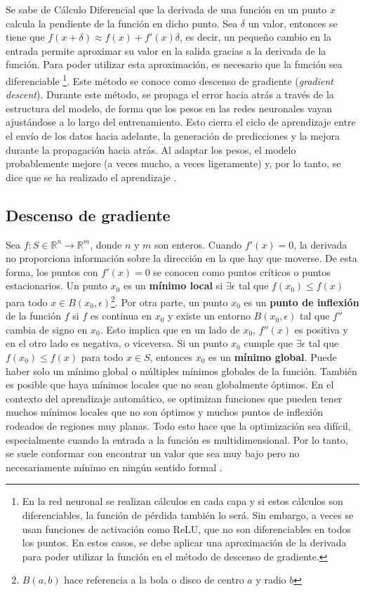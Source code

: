 Se sabe de Cálculo Diferencial que la derivada de una función en un punto $x$ calcula la pendiente de la función en dicho punto. Sea $\delta$ un valor, entonces se tiene que $f(x + \delta) \approx f(x) + f'(x)\delta$, es decir, un pequeño cambio en la entrada permite aproximar su valor en la salida gracias a la derivada de la función. Para poder utilizar esta aproximación, es necesario que la función sea diferenciable \footnote{En la red neuronal se realizan cálculos en cada capa y si estos cálculos son diferenciables, la función de pérdida también lo será. Sin embargo, a veces se usan funciones de activación como ReLU, que no son diferenciables en todos los puntos. En estos casos, se debe aplicar una aproximación de la derivada para poder utilizar la función en el método de descenso de gradiente.}. Este método se conoce como descenso de gradiente (\textit{gradient descent}). Durante este método, se propaga el error hacia atrás a través de la estructura del modelo, de forma que los pesos en las redes neuronales vayan ajustándose a lo largo del entrenamiento. Esto cierra el ciclo de aprendizaje entre el envío de los datos hacia adelante, la generación de predicciones y la mejora durante la propagación hacia atrás. Al adaptar los pesos, el modelo probablemente mejore (a veces mucho, a veces ligeramente) y, por lo tanto, se dice que se ha realizado el aprendizaje \citep{pajares2021aprendizaje}. 

\subsection{Descenso de gradiente}


Sea $f: S \in \mathbb{R}^n \to \mathbb{R}^m$, donde $n$ y $m$ son enteros. Cuando $f'(x) = 0$, la derivada no proporciona información sobre la dirección en la que hay que moverse. De esta forma, los puntos con $f'(x) = 0$ se conocen como puntos críticos o puntos estacionarios. Un punto $x_0$ es un \textbf{mínimo local} si $\exists \epsilon$ tal que $f(x_0) \leq f(x)$ para todo $x \in B(x_0, \epsilon)$\footnote{$B(a,b)$ hace referencia a la bola o disco de centro $a$ y radio $b$}. Por otra parte, un punto \( x_0 \) es un \textbf{punto de inflexión} de la función \( f \) si \( f \) es continua en \( x_0 \) y existe un entorno \( B(x_0, \epsilon) \) tal que \( f'' \) cambia de signo en \( x_0 \). Esto implica que en un lado de \( x_0 \),  \( f''(x) \) es positiva y en el otro lado es negativa, o viceversa. Si un punto $x_0$ cumple que $\exists \epsilon$ tal que $f(x_0) \leq f(x)$ para todo $x \in S$, entonces $x_0$ es un \textbf{mínimo global}. Puede haber solo un mínimo global o múltiples mínimos globales de la función. También es posible que haya mínimos locales que no sean globalmente óptimos. En el contexto del aprendizaje automático, se optimizan funciones que pueden tener muchos mínimos locales que no son óptimos y muchos puntos de inflexión rodeados de regiones muy planas. Todo esto hace que la optimización sea difícil, especialmente cuando la entrada a la función es multidimensional. Por lo tanto, se suele conformar con encontrar un valor que sea muy bajo pero no necesariamente mínimo en ningún sentido formal \citep{pajares2021aprendizaje}.


